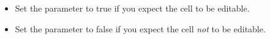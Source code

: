  \begin{itemize}
\item Set the parameter to true if you expect the cell to be editable.
\item Set the parameter to false if you expect the cell \emph{not} to be editable.
\end{itemize}
   
